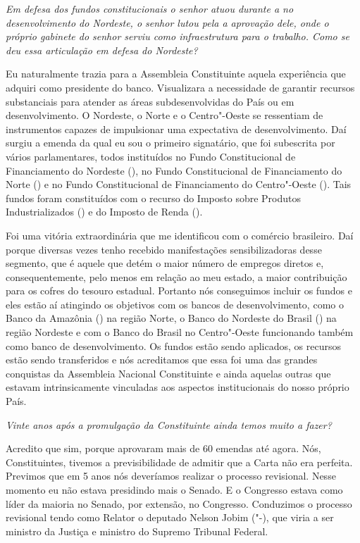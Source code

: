 \medskip

\emph{Em defesa dos fundos constitucionais o senhor atuou durante a
 no desenvolvimento do Nordeste, o senhor lutou pela a aprovação
dele, onde o próprio gabinete do senhor serviu como infraestrutura para
o trabalho. Como se deu essa articulação em defesa do Nordeste?}

Eu naturalmente trazia para a Assembleia
Constituinte aquela experiência que adquiri como presidente do banco.
Visualizara a necessidade de garantir recursos substanciais para atender
as áreas subdesenvolvidas do País ou em desenvolvimento. O Nordeste, o
Norte e o Centro"-Oeste se ressentiam de instrumentos capazes de
impulsionar uma expectativa de desenvolvimento. Daí surgiu a emenda da
qual eu sou o primeiro signatário, que foi subescrita por vários
parlamentares, todos instituídos no Fundo Constitucional de
Financiamento do Nordeste (), no Fundo Constitucional de
Financiamento do Norte () e no Fundo Constitucional de Financiamento
do Centro"-Oeste (). Tais fundos foram constituídos com o recurso do
Imposto sobre Produtos Industrializados () e do Imposto de Renda
().

Foi uma vitória extraordinária que me identificou com o comércio
brasileiro. Daí porque diversas vezes tenho recebido manifestações
sensibilizadoras desse segmento, que é aquele que detém o maior número
de empregos diretos e, consequentemente, pelo menos em relação ao meu
estado, a maior contribuição para os cofres do tesouro estadual.
Portanto nós conseguimos incluir os fundos e eles estão aí atingindo os
objetivos com os bancos de desenvolvimento, como o Banco da Amazônia
() na região Norte, o Banco do Nordeste do Brasil () na região
Nordeste e com o Banco do Brasil no Centro"-Oeste funcionando também como
banco de desenvolvimento. Os fundos estão sendo aplicados, os recursos
estão sendo transferidos e nós acreditamos que essa foi uma das grandes
conquistas da Assembleia Nacional Constituinte e ainda aquelas outras
que estavam intrinsicamente vinculadas aos aspectos institucionais do
nosso próprio País.

\medskip

\emph{Vinte anos após a promulgação da Constituinte ainda temos muito
a fazer?}

Acredito que sim, porque aprovaram mais de 60
emendas até agora. Nós, Constituintes, tivemos a previsibilidade de
admitir que a Carta não era perfeita. Previmos que em 5 anos nós
deveríamos realizar o processo revisional. Nesse momento eu não estava
presidindo mais o Senado. E o Congresso estava como líder da maioria no
Senado, por extensão, no Congresso. Conduzimos o processo revisional
tendo como Relator o deputado Nelson Jobim ("-), que viria a ser
ministro da Justiça e ministro do Supremo Tribunal Federal.

